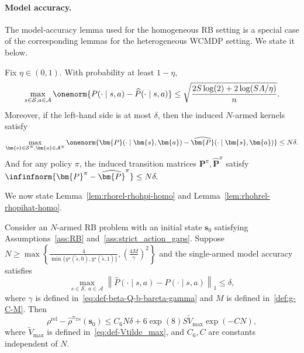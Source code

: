 \documentclass[mnsc,nonblindrev]{informs3}
\newcommand{\bp}{\bm{P}}
\newcommand{\bphat}{\widehat{\bm{P}}}
\newcommand{\pits}{\pi_{\mathrm{TS}}}
\newcommand{\bms}{\bm{s}}
\newcommand{\bma}{\bm{a}}
\newcommand{\States}{\mathcal{S}}
\newcommand{\Actions}{\mathcal{A}}
\begin{document}
\paragraph{Model accuracy.} The model-accuracy lemma used for the homogeneous RB setting is a special
case of the corresponding lemmas for the heterogeneous WCMDP setting. We state it below.
\begin{lemma}\label{samplesize-singlearm_accu_rb}\label{single-to-Narm-accu}
Fix $\eta\in(0,1)$. With probability at least $1-\eta$,
\[
    \max_{s\in\States,a\in\Actions}
    \onenorm{P(\cdot\mid s,a)-\widehat P(\cdot\mid s,a)}
    \le
    \sqrt{\frac{2S\log(2)+2\log(SA/\eta)}{n}}.
\]
Moreover, if the left-hand side is at most $\delta$, then the induced $N$-armed kernels satisfy
\[
    \max_{\bms\in\States^N,\bma\in\Actions^N}
    \onenorm{\bp(\cdot\mid\bms,\bma)-\bphat(\cdot\mid\bms,\bma)}
    \le N\delta.
\]
And for any policy \(\pi\), the induced transition matrices $\bp^\pi, \bphat^\pi$ satisfy $\infinfnorm{\bp^\pi-\bphat^\pi}
    \le
    N\delta .$

\end{lemma}
We now state Lemma~\ref{lem:rhorel-rhohpi-homo} and Lemma~\ref{lem:rhohrel-rhopihat-homo}.
\begin{lemma}[Bound on $\rho^{\mathrm{rel}}-\widehat\rho^{\pits}(\bms_0)$]\label{lem:rhorel-rhohpi-homo}
Consider an $N$-armed RB problem with an initial state $\bms_0$ satisfying Assumptions~\ref{ass:RB} and~\ref{ass:strict_action_gaps}. Suppose
\(
N\ge \max\left\{\frac{4}{\min\{y^\star(\tilde{s},0),y^\star(\tilde{s},1)\}},\left(\frac{4M}{\gamma}\right)^2\right\}
\)
and the single-armed model accuracy satisfies
\[
\max_{s\in\mathcal S,\ a\in\mathcal A}\left\|\widehat P(\cdot\mid s,a)-P(\cdot\mid s,a)\right\|_1\le \delta,
\]
where $\gamma$ is defined in~\eqref{eq:def-beta-Q-b-bareta-gamma} and $M$ is defined in~\eqref{def:g-C-M}. Then
\[
\rho^{\mathrm{rel}}-\widehat\rho^{\pits}(\bms_0)
\le C_6N\delta+6\exp(8)S\widetilde V_{\max}\exp(-CN),
\]
where $\widetilde V_{\max}$ is defined in~\eqref{eq:def-Vtilde_max}, and $C_6,C$ are constants independent of $N$.
\end{lemma}
\end{document}
